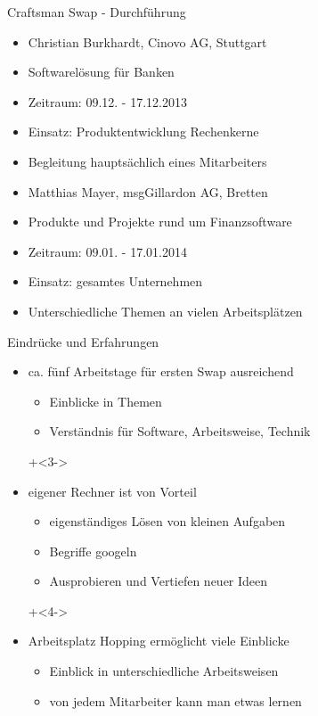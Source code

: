 \begin{frame}{Craftsman Swap - Durchführung}
 
\begin{itemize}
                \item Christian Burkhardt, Cinovo AG, Stuttgart
                \item Softwarelösung für Banken
                \item Zeitraum: 09.12. - 17.12.2013
                \item Einsatz: Produktentwicklung Rechenkerne
                \item Begleitung hauptsächlich eines Mitarbeiters
\end{itemize}
               
\begin{itemize}
                \item Matthias Mayer, msgGillardon AG, Bretten
                \item Produkte und Projekte rund um Finanzsoftware
                \item Zeitraum: 09.01. - 17.01.2014
                \item Einsatz: gesamtes Unternehmen
                \item Unterschiedliche Themen an vielen Arbeitsplätzen
\end{itemize}
 
 
\end{frame}


\begin{frame}{Eindrücke und Erfahrungen}

\begin{itemize}
\onslide+<2->
\item ca. fünf Arbeitstage für ersten Swap ausreichend
\begin{itemize}
\item Einblicke in Themen
\item Verständnis für Software, Arbeitsweise, Technik
\end{itemize}

\onslide+<3->
\item eigener Rechner ist von Vorteil
\begin{itemize}
\item eigenständiges Lösen von kleinen Aufgaben
\item Begriffe googeln
\item Ausprobieren und Vertiefen neuer Ideen
\end{itemize}

\onslide+<4->
\item Arbeitsplatz Hopping ermöglicht viele Einblicke
\begin{itemize}
\item Einblick in unterschiedliche Arbeitsweisen
\item von jedem Mitarbeiter kann man etwas lernen
\end{itemize}

\end{itemize}

\end{frame}

